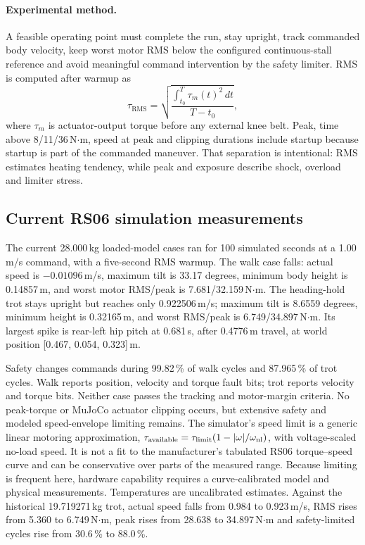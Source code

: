 \documentclass[11pt,a4paper]{article}
\begin{document}
\paragraph{Experimental method.} A feasible operating point must complete the
run, stay upright, track commanded body velocity, keep worst motor RMS below
the configured continuous-stall reference and avoid meaningful command
intervention by the safety limiter. RMS is computed after warmup as
\[
  \tau_{\mathrm{RMS}} =
  \sqrt{\frac{\int_{t_0}^{T}\tau_m(t)^2\,dt}{T-t_0}},
\]
where $\tau_m$ is actuator-output torque before any external knee belt. Peak,
time above 8/11/36\,N$\cdot$m, speed at peak and clipping durations include
startup because startup is part of the commanded maneuver. That separation is
intentional: RMS estimates heating tendency, while peak and exposure describe
shock, overload and limiter stress.

\subsection{Current RS06 simulation measurements}

The current 28.000\,kg loaded-model cases ran for 100 simulated seconds at a
1.00\,m/s command, with a five-second RMS warmup. The walk case falls: actual
speed is $-0.01096$\,m/s, maximum tilt is 33.17 degrees, minimum body height is
0.14857\,m, and worst motor RMS/peak is 7.681/32.159\,N$\cdot$m. The heading-hold
trot stays upright but reaches only 0.922506\,m/s; maximum tilt is 8.6559
degrees, minimum height is 0.32165\,m, and worst RMS/peak is
6.749/34.897\,N$\cdot$m. Its largest spike is rear-left hip pitch at 0.681\,s,
after 0.4776\,m travel, at world position [0.467, 0.054, 0.323]\,m.

Safety changes commands during 99.82\,\% of walk cycles and 87.965\,\% of trot
cycles. Walk reports position, velocity and torque fault bits; trot reports
velocity and torque bits. Neither case passes the tracking and motor-margin
criteria. No peak-torque or MuJoCo actuator clipping occurs, but extensive
safety and modeled speed-envelope limiting remains. The simulator's speed
limit is a generic linear motoring approximation,
$\tau_{\rm available}=\tau_{\rm limit}(1-|\omega|/\omega_{\rm nl})$, with
voltage-scaled no-load speed. It is not a fit to the manufacturer's tabulated
RS06 torque--speed curve and can be conservative over parts of the measured
range. Because limiting is frequent here, hardware capability requires a
curve-calibrated model and physical measurements. Temperatures are uncalibrated
estimates. Against the historical 19.719271\,kg trot, actual speed
falls from 0.984 to 0.923\,m/s, RMS rises from 5.360 to 6.749\,N$\cdot$m, peak
rises from 28.638 to 34.897\,N$\cdot$m and safety-limited cycles rise from
30.6\,\% to 88.0\,\%.
\end{document}

